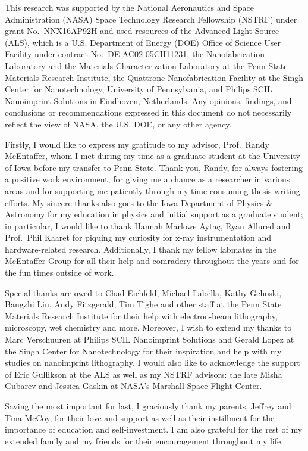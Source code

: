 

This research was supported by the National Aeronautics and Space Administration (NASA) Space Technology Research Fellowship (NSTRF) under grant No.\ NNX16AP92H and used resources of the Advanced Light Source (ALS), which is a U.S. Department of Energy (DOE) Office of Science User Facility under contract No.\ DE-AC02-05CH11231, the Nanofabrication Laboratory and the Materials Characterization Laboratory at the Penn State Materials Research Institute, the Quattrone Nanofabrication Facility at the Singh Center for Nanotechnology, University of Pennsylvania, and Philips SCIL Nanoimprint Solutions in Eindhoven, Netherlands. 
Any opinions, findings, and conclusions or recommendations expressed in this document do not necessarily reflect the view of NASA, the U.S. DOE, or any other agency. 

Firstly, I would like to express my gratitude to my advisor, Prof.\ Randy McEntaffer, whom I met during my time as a graduate student at the University of Iowa before my transfer to Penn State. 
Thank you, Randy, for always fostering a positive work environment, for giving me a chance as a researcher in various areas and for supporting me patiently through my time-consuming thesis-writing efforts. 
My sincere thanks also goes to the Iowa Department of Physics \& Astronomy for my education in physics and initial support as a graduate student; in particular, I would like to thank Hannah Marlowe Ayta\c{c}, Ryan Allured and Prof.\ Phil Kaaret for piquing my curiosity for x-ray instrumentation and hardware-related research. 
Additionally, I thank my fellow labmates in the McEntaffer Group for all their help and comradery throughout the years and for the fun times outside of work. 

Special thanks are owed to Chad Eichfeld, Michael Labella, Kathy Gehoski, Bangzhi Liu, Andy Fitzgerald, Tim Tighe and other staff at the Penn State Materials Research Institute for their help with electron-beam lithography, microscopy, wet chemistry and more. 
Moreover, I wish to extend my thanks to Marc Verschuuren at Philips SCIL Nanoimprint Solutions and Gerald Lopez at the Singh Center for Nanotechnology for their inspiration and help with my studies on nanoimprint lithography. 
I would also like to acknowledge the support of Eric Gullikson at the ALS as well as my NSTRF advisors: the late Misha Gubarev and Jessica Gaskin at NASA's Marshall Space Flight Center.  

Saving the most important for last, I graciously thank my parents, Jeffrey and Tina McCoy, for their love and support as well as their instillment for the importance of education and self-investment. I am also grateful for the rest of my extended family and my friends for their encouragement throughout my life. 

